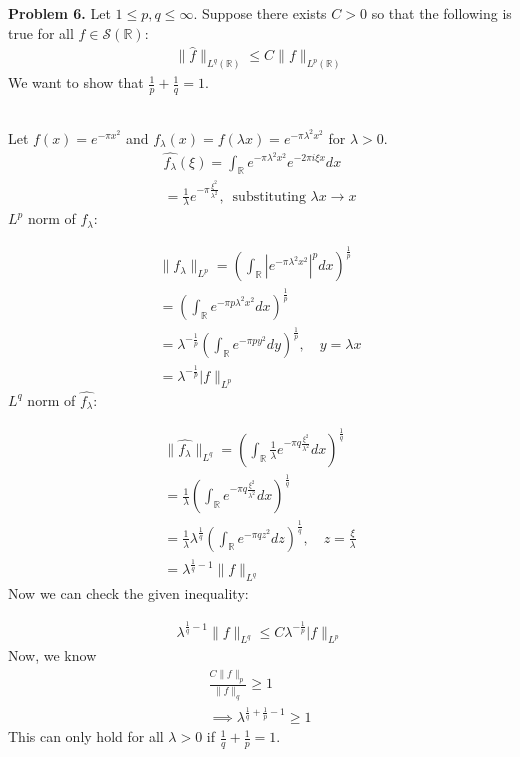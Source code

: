 \documentclass{article}
\newcommand{\R}{\mathbb{R}}
\newcommand{\Sc}{\mathcal{S}}
\begin{document}
\textbf{Problem 6. } Let $1\leq p,q\leq \infty$. Suppose there exists $C > 0$ so that the following is true for all $f \in \Sc(\R)$:
\begin{gather*}
    \lVert \hat{f} \rVert_{L^q(\R)} \leq C \lVert f \rVert_{L^p(\R)}
\end{gather*}
We want to show that $\frac{1}{p} + \frac{1}{q} = 1$.
\\~

Let $f(x) = e^{-\pi x^2}$ and $f_{\lambda}(x) = f(\lambda x) = e^{-\pi \lambda^2 x^2}$ for $\lambda>0$.
\begin{gather*}
    \hat{f_{\lambda}} (\xi) = \int_{\R} e^{-\pi \lambda^2x^2} e^{-2\pi i \xi x} dx\\
    = \frac{1}{\lambda} e^{-\pi \frac{\xi^2}{\lambda^2}} ,\, \text{ substituting } \lambda x \to x
\end{gather*}
$L^p$ norm of $f_{\lambda}$:

\begin{gather*}
    \lVert f_{\lambda} \rVert_{L^p} = \left( \int_{\R} |e^{-\pi \lambda^2 x^2}|^p dx \right)^{\frac{1}{p}}\\
    = \left( \int_{\R} e^{-\pi p\lambda^2 x^2} dx \right)^{\frac{1}{p}}\\
    = \lambda^{-\frac{1}{p}}\left( \int_{\R} e^{-\pi p y^2} dy \right)^{\frac{1}{p}} ,\quad y = \lambda x\\
    = \lambda^{-\frac{1}{p}} \lvert f \rVert_{L^p}
\end{gather*}
$L^q$ norm of $\hat{f_{\lambda}}$:

\begin{gather*}
    \lVert \hat{f_{\lambda}} \rVert_{L^q} = \left( \int_{\R} \frac{1}{\lambda} e^{-\pi q\frac{\xi^2}{\lambda^2}}dx \right)^{\frac{1}{q}}\\
    = \frac{1}{\lambda} \left( \int_{\R} e^{-\pi q\frac{\xi^2}{\lambda^2}}dx \right)^{\frac{1}{q}}\\
    = \frac{1}{\lambda} \lambda^{\frac{1}{q}} \left( \int_{\R} e^{-\pi q z^2}dz \right)^{\frac{1}{q}} ,\quad z = \frac{\xi}{\lambda} \\
    = \lambda^{\frac{1}{q} - 1} \lVert f \rVert_{L^q}
\end{gather*}
Now we can check the given inequality:

\begin{gather*}
    \lambda^{\frac{1}{q} - 1} \lVert f \rVert_{L^q} \leq C \lambda^{-\frac{1}{p}} \lvert f \rVert_{L^p}
\end{gather*}
Now, we know 
\begin{gather*}
    \frac{C \lVert f\rVert_p}{\lVert f\rVert_q} \geq 1\\
    \implies \lambda^{\frac{1}{q}+\frac{1}{p} -1} \geq 1
\end{gather*}
This can only hold for all $\lambda >0$ if $\frac{1}{q}+\frac{1}{p} = 1$.
\end{document}
